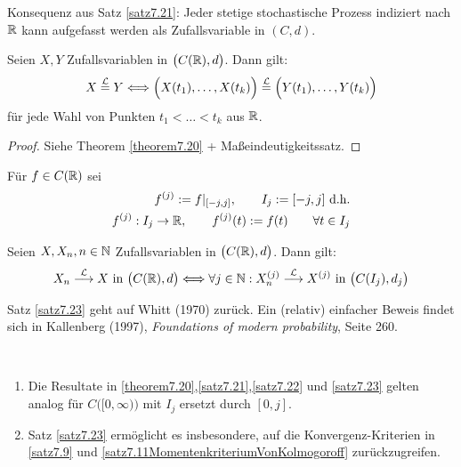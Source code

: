Konsequenz aus Satz \ref{satz7.21}: Jeder stetige stochastische Prozess indiziert nach $\mathbb{R}$ kann aufgefasst werden als Zufallsvariable in $(C,d)$.

\begin{satz}\label{satz7.22}
	Seien $X,Y$ Zufallsvariablen in $\big(C(\mathbb{R}),d\big)$. Dann gilt:
	\begin{align*}
		X\stackrel{\mathcal{L}}{=}Y\Longleftrightarrow
		\Big(X(t_1),\ldots,X(t_k)\Big)\stackrel{\mathcal{L}}{=}\Big(Y(t_1),\ldots,Y(t_k)\Big)
	\end{align*}
	für jede Wahl von Punkten $t_1<\ldots<t_k$ aus $\mathbb{R}$.
\end{satz}

\begin{proof}
	Siehe Theorem \ref{theorem7.20} + Maßeindeutigkeitssatz.
\end{proof}

Für $f\in C(\mathbb{R})$ sei
\begin{align*}
	f^{(j)}:=f|_{[-j,j]},\qquad I_j:=[-j,j]\text{ d.h.}\\
	f^{(j)}:I_j\to\mathbb{R},\qquad f^{(j)}(t):=f(t)\qquad\forall t\in I_j
\end{align*}

\begin{satz}\label{satz7.23}
	Seien $X,X_n,n\in\mathbb{N}$ Zufallsvariablen in $\big(C(\mathbb{R}),d\big)$. Dann gilt:
	\begin{align*}
		X_n\stackrel{\mathcal{L}}{\longrightarrow}X\text{ in }\big(C(\mathbb{R}),d\big)
		\Longleftrightarrow\forall j\in\mathbb{N}:
		X_n^{(j)}\stackrel{\mathcal{L}}{\longrightarrow} X^{(j)}\text{ in }\big(C(I_j),d_j\big)
	\end{align*}
\end{satz}

Satz \ref{satz7.23} geht auf Whitt (1970) zurück. Ein (relativ) einfacher Beweis findet sich in Kallenberg (1997), \textit{Foundations of modern probability}, Seite 260.

\begin{bemerkungnr}\label{bemerkung7.24}\
	\begin{enumerate}[label=(\arabic*)]
		\item Die Resultate in \ref{theorem7.20},\ref{satz7.21},\ref{satz7.22} und \ref{satz7.23} gelten analog für $C\big([0,\infty)\big)$ mit $I_j$ ersetzt durch $[0,j]$.
		\item Satz \ref{satz7.23} ermöglicht es insbesondere, auf die Konvergenz-Kriterien in \ref{satz7.9} und \ref{satz7.11MomentenkriteriumVonKolmogoroff} zurückzugreifen.
	\end{enumerate}
\end{bemerkungnr}

